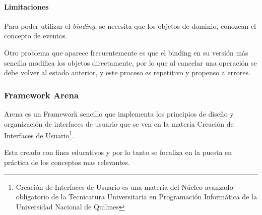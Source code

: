 \paragraph{Limitaciones}
	Para poder utilizar el \emph{binding}, se necesita que los objetos de dominio, 
	conozcan el concepto de eventos.
	
	Otro problema que aparece frecuentemente es que el binding en su versión más 
	sencilla modifica los objetos directamente, por lo que al cancelar una operación 
	se debe volver al estado anterior, y este proceso es repetitivo y propenso a errores. 

	
\subsubsection{Framework Arena}
	Arena es un Framework sencillo que implementa los principios de diseño y
	organización de interfaces de usuario que se ven en la materia Creación de
	Interfaces de Usuario\footnote{Creación de Interfaces de Usuario
	es una materia del Núcleo avanzado obligatorio de la Tecnicatura
	Universitaria en Programación Informática de la Universidad Nacional de
	Quilmes}.
	
	Esta creado con fines educativos y por lo tanto se focaliza en la puesta en
	práctica de los conceptos mas relevantes.